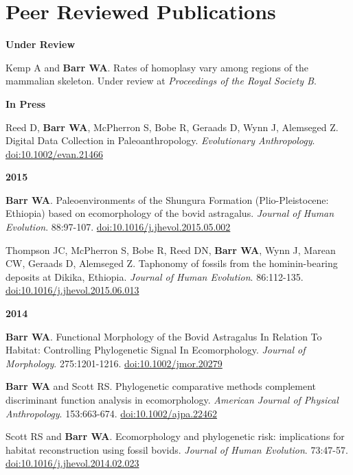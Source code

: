 \documentclass{article}
\begin{document}
\section*{Peer Reviewed Publications}

\begin{description*}
\item[] {\bfseries Under Review}
\item[] Kemp A and {\bfseries Barr WA}. Rates of homoplasy vary among regions of the mammalian skeleton. Under review at \emph{Proceedings of the Royal Society B}.
\end{description*}

\begin{description*}
\item[]{\bfseries In Press}
\item Reed D, {\bfseries Barr WA}, McPherron S, Bobe R, Geraads D, Wynn J, Alemseged Z. Digital Data Collection in Paleoanthropology. \emph{Evolutionary Anthropology}. \href{http://dx.doi.org/10.1002/evan.21466}{doi:10.1002/evan.21466}
\end{description*}

\begin{description*}
\item[] {\bfseries 2015}
\item[] {\bfseries Barr WA}. Paleoenvironments of the Shungura Formation (Plio-Pleistocene: Ethiopia) based on ecomorphology of the bovid astragalus. \emph{Journal of Human Evolution}. 88:97-107. \href{http://dx.doi.org/10.1016/j.jhevol.2015.05.002}{doi:10.1016/j.jhevol.2015.05.002}
\item[] Thompson JC, McPherron S, Bobe R, Reed DN, {\bfseries Barr WA}, Wynn J, Marean CW, Geraads D, Alemseged Z. Taphonomy of fossils from the hominin-bearing deposits at Dikika, Ethiopia. \emph{Journal of Human Evolution}. 86:112-135. \href{http://dx.doi.org/10.1016/j.jhevol.2015.06.013}{doi:10.1016/j.jhevol.2015.06.013}
\end{description*}

\begin{description*}
\item[] {\bfseries 2014}
\item[] {\bfseries Barr WA}. Functional Morphology of the Bovid Astragalus In Relation To Habitat: Controlling Phylogenetic Signal In Ecomorphology. \emph{Journal
of Morphology}. 275:1201-1216. \href{http://dx.doi.org/10.1002/jmor.20279}{doi:10.1002/jmor.20279}

\item[] {\bfseries Barr WA} and Scott RS. Phylogenetic comparative methods complement discriminant function analysis in ecomorphology. \emph{American Journal
of Physical Anthropology}. 153:663-674. \href{http://dx.doi.org/10.1002/ajpa.22462}{doi:10.1002/ajpa.22462}

\item[] Scott RS and {\bfseries Barr WA}. Ecomorphology and phylogenetic risk: implications for habitat reconstruction using fossil bovids.
\emph{Journal of Human Evolution}. 73:47-57. \href{http://dx.doi.org/10.1016/j.jhevol.2014.02.023}{doi:10.1016/j.jhevol.2014.02.023}

\end{description*}
\end{document}
